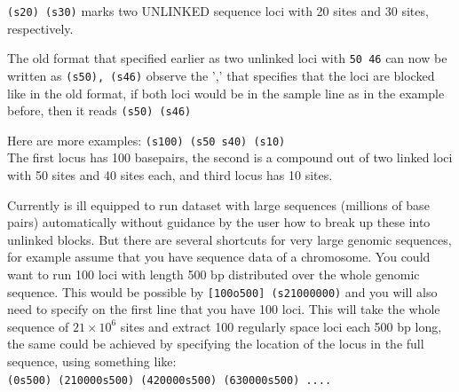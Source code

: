 \texttt{(s20) (s30)}
marks two UNLINKED sequence loci with 20 sites and 30 sites, respectively. 


The old format that specified earlier as two unlinked loci with \texttt{50 46} can now be written as 
\texttt{(s50), (s46)} observe the ',' that specifies that the loci are blocked like in the old format, if both loci would be in the sample line as in the example before, then it reads 
\texttt{(s50) (s46)}

Here are more examples:
\texttt{(s100) (s50 s40) (s10)}\\
The first locus has 100 basepairs, the second is a compound out of two linked loci with 50 sites and 40 sites each, and third locus has 10 sites. 

Currently \migrate is ill equipped  to run dataset with large sequences (millions of base pairs) automatically without guidance by the user how to break up these into unlinked blocks. But there are
several shortcuts for very large genomic sequences, for example assume that you have sequence data of a chromosome. You could want to run 100 loci with length 500 bp distributed over the whole genomic sequence. This would be possible by
\texttt{[100o500] (s21000000)} and you will also need to specify on the first line that you have 100 loci.
This will take the whole sequence of $21\times10^6$ sites and extract 100 regularly space loci each 500 bp long, the same could be achieved by specifying the location of the locus in the full sequence, using something like:\\
\texttt{(0s500) (210000s500) (420000s500) (630000s500) ....}

